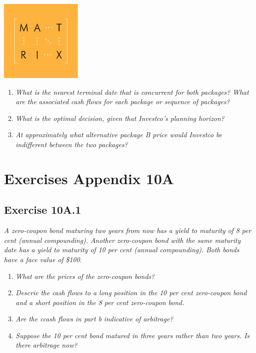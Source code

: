 \documentclass[]{book}
\theoremstyle{definition}
\theoremstyle{definition}
\theoremstyle{remark}
\begin{document}
\begin{center}\includegraphics[width=150px]{figures/matrix} \end{center}

\begin{enumerate}
\def\labelenumi{\alph{enumi}.}
\item
  \emph{What is the nearest terminal date that is concurrent for both
  packages? What are the associated cash flows for each package or
  sequence of packages?} \citep[p.340]{book}
\item
  \emph{What is the optimal decision, given that Investco's planning
  horizon?} \citep[p.340]{book}
\item
  \emph{At approximately what alternative package B price would Investco
  be indifferent between the two packages?} \citep[p.340]{book}
\end{enumerate}

\section{Exercises Appendix 10A}\label{exercises-appendix-10a}

\subsection{Exercise 10A.1}\label{exercise-10a.1}

\emph{A zero-coupon bond maturing two years from now has a yield to
maturity of 8 per cent (annual compounding). Another zero-coupon bond
with the same maturity date has a yield to maturity of 10 per cent
(annual compounding). Both bonds have a face value of \$100.}
\citep[p.340]{book}

\begin{enumerate}
\def\labelenumi{\alph{enumi}.}
\item
  \emph{What are the prices of the zero-coupon bonds?}
  \citep[p.347]{book}
\item
  \emph{Descrie the cash flows to a long position in the 10 per cent
  zero-coupon bond and a short position in the 8 per cent zero-coupon
  bond.} \citep[p.347]{book}
\item
  \emph{Are the ccash flows in part b indicative of arbitrage?}
  \citep[p.347]{book}
\item
  \emph{Suppose the 10 per cent bond matured in three years rather than
  two years. Is there arbitrage now?} \citep[p.347]{book}
\end{enumerate}
\end{document}
